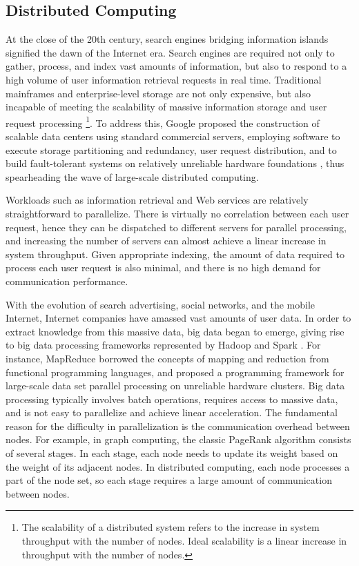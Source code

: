 \subsection{Distributed Computing}
\label{background:sec:datacenter-distributed}

At the close of the 20th century, search engines bridging information islands signified the dawn of the Internet era. Search engines are required not only to gather, process, and index vast amounts of information, but also to respond to a high volume of user information retrieval requests in real time. Traditional mainframes and enterprise-level storage are not only expensive, but also incapable of meeting the scalability of massive information storage and user request processing \footnote{The scalability of a distributed system refers to the increase in system throughput with the number of nodes. Ideal scalability is a linear increase in throughput with the number of nodes.}. To address this, Google proposed the construction of scalable data centers using standard commercial servers, employing software to execute storage partitioning and redundancy, user request distribution, and to build fault-tolerant systems on relatively unreliable hardware foundations \cite{ghemawat2003google,chang2008bigtable,dean2008mapreduce}, thus spearheading the wave of large-scale distributed computing.

Workloads such as information retrieval and Web services are relatively straightforward to parallelize. There is virtually no correlation between each user request, hence they can be dispatched to different servers for parallel processing, and increasing the number of servers can almost achieve a linear increase in system throughput. Given appropriate indexing, the amount of data required to process each user request is also minimal, and there is no high demand for communication performance.

With the evolution of search advertising, social networks, and the mobile Internet, Internet companies have amassed vast amounts of user data. In order to extract knowledge from this massive data, big data began to emerge, giving rise to big data processing frameworks represented by Hadoop \cite{white2012hadoop} and Spark \cite{zaharia2010spark}. For instance, MapReduce \cite{dean2008mapreduce} borrowed the concepts of mapping and reduction from functional programming languages, and proposed a programming framework for large-scale data set parallel processing on unreliable hardware clusters.
Big data processing typically involves batch operations, requires access to massive data, and is not easy to parallelize and achieve linear acceleration.
The fundamental reason for the difficulty in parallelization is the communication overhead between nodes.
For example, in graph computing, the classic PageRank algorithm \cite{page1999pagerank} consists of several stages. In each stage, each node needs to update its weight based on the weight of its adjacent nodes. In distributed computing, each node processes a part of the node set, so each stage requires a large amount of communication between nodes.

